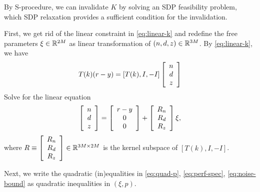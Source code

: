 \documentclass[11pt, onecolumn]{article}
\theoremstyle{plain}
\theoremstyle{plain}
\theoremstyle{definition}
\begin{document}
By S-procedure, we can invalidate $K$ by solving an SDP feasibility problem, which SDP relaxation
provides a sufficient condition for the invalidation.

First, we get rid of the linear constraint in \eqref{eq:linear-k} and redefine the free parameters
$\xi \in\mathbb R^{2M}$ as linear transformation of $(n,d,z) \in\mathbb R^{3M}$.  By \eqref{eq:linear-k}, we have
\begin{align*}
  T(k) (r-y) = [T(k), I, - I]   \left[ \begin{array}[c]{c} n\\d\\z \end{array} \right]
\end{align*}
Solve for the linear equation
\begin{align}
  \label{eq:ndz-xi}
  \left[ \begin{array}[c]{c} n\\d\\z \end{array} \right]
  = \left[ \begin{array}[c]{c} r-y\\0\\0 \end{array} \right]
  +  \left[ \begin{array}[c]{c} R_n\\R_d\\R_z \end{array} \right] \xi,
\end{align}
where $R\equiv \left[ \begin{array}[c]{c} R_n\\R_d\\R_z \end{array} \right] \in\mathbb R^{3M\times 2M}$ is the
kernel subspace of $ [T(k), I, - I] $.

Next, we write the quadratic (in)equalities in \eqref{eq:quad-p}, \eqref{eq:perf-spec},
\eqref{eq:noise-bound} as quadratic inequalities in $(\xi, p)$.
\end{document}

